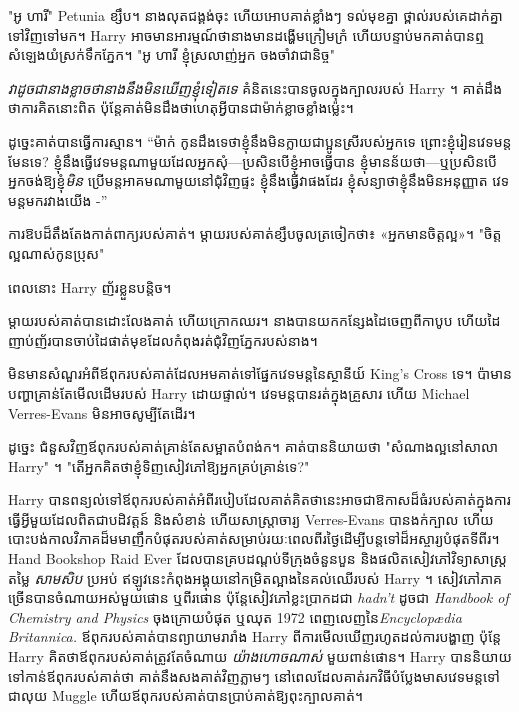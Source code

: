 "អូ ហារី" Petunia ខ្សឹប។ នាងលុតជង្គង់ចុះ ហើយអោបគាត់ខ្លាំងៗ ទល់មុខគ្នា ថ្ពាល់របស់គេដាក់គ្នាទៅវិញទៅមក។ Harry អាច​មាន​អារម្មណ៍​ថា​នាង​មាន​ដង្ហើម​ក្រៀមក្រំ ហើយ​បន្ទាប់​មក​គាត់​បាន​ឮ​សំឡេង​យំ​ស្រក់​ទឹក​ភ្នែក។ "អូ ហារី ខ្ញុំស្រលាញ់អ្នក ចងចាំវាជានិច្ច"

\emph{វាដូចជានាងខ្លាចថានាងនឹងមិនឃើញខ្ញុំទៀតទេ} គំនិតនេះបានចូលក្នុងក្បាលរបស់ Harry ។ គាត់​ដឹង​ថា​ការ​គិត​នោះ​ពិត ប៉ុន្តែ​គាត់​មិន​ដឹង​ថា​ហេតុ​អ្វី​បាន​ជា​ម៉ាក់​ខ្លាច​ខ្លាំង​ម្ល៉េះ។

ដូច្នេះគាត់បានធ្វើការស្មាន។ “ម៉ាក់ កូនដឹងទេថាខ្ញុំនឹងមិនក្លាយជាប្អូនស្រីរបស់អ្នកទេ ព្រោះខ្ញុំរៀនវេទមន្តមែនទេ? ខ្ញុំនឹងធ្វើវេទមន្តណាមួយដែលអ្នកសុំ—ប្រសិនបើខ្ញុំអាចធ្វើបាន ខ្ញុំមានន័យថា—ឬប្រសិនបើអ្នកចង់ឱ្យខ្ញុំ\emph{មិន} ប្រើមន្តអាគមណាមួយនៅជុំវិញផ្ទះ ខ្ញុំនឹងធ្វើវាផងដែរ ខ្ញុំសន្យាថាខ្ញុំនឹងមិនអនុញ្ញាត វេទមន្តមករវាងយើង -”

ការ​ឱប​ដ៏​តឹង​តែង​កាត់​ពាក្យ​របស់​គាត់។ ម្ដាយ​របស់​គាត់​ខ្សឹប​ចូល​ត្រចៀក​ថា៖ «អ្នក​មាន​ចិត្ត​ល្អ»។ "ចិត្តល្អណាស់កូនប្រុស"

ពេលនោះ Harry ញ័រខ្លួនបន្តិច។

ម្តាយ​របស់​គាត់​បាន​ដោះ​លែង​គាត់ ហើយ​ក្រោក​ឈរ។ នាងបានយកកន្សែងដៃចេញពីកាបូប ហើយដៃញាប់ញ័របានចាប់ដៃផាត់មុខដែលកំពុងរត់ជុំវិញភ្នែករបស់នាង។

មិនមានសំណួរអំពីឪពុករបស់គាត់ដែលអមគាត់ទៅផ្នែកវេទមន្តនៃស្ថានីយ៍ King's Cross ទេ។ ប៉ាមានបញ្ហាគ្រាន់តែមើលដើមរបស់ Harry ដោយផ្ទាល់។ វេទមន្តបានរត់ក្នុងគ្រួសារ ហើយ Michael Verres-Evans មិនអាចសូម្បីតែដើរ។

ដូច្នេះ ជំនួស​វិញ​ឪពុក​របស់​គាត់​គ្រាន់​តែ​សម្អាត​បំពង់ក។ គាត់បាននិយាយថា "សំណាងល្អនៅសាលា Harry" ។ "តើអ្នកគិតថាខ្ញុំទិញសៀវភៅឱ្យអ្នកគ្រប់គ្រាន់ទេ?"

Harry បានពន្យល់ទៅឪពុករបស់គាត់អំពីរបៀបដែលគាត់គិតថានេះអាចជាឱកាសដ៏ធំរបស់គាត់ក្នុងការធ្វើអ្វីមួយដែលពិតជាបដិវត្តន៍ និងសំខាន់ ហើយសាស្រ្តាចារ្យ Verres-Evans បានងក់ក្បាល ហើយបោះបង់កាលវិភាគដ៏មមាញឹកបំផុតរបស់គាត់សម្រាប់រយៈពេលពីរថ្ងៃដើម្បីបន្តទៅដ៏អស្ចារ្យបំផុតទីពីរ។ Hand Bookshop Raid Ever ដែលបានគ្របដណ្តប់ទីក្រុងចំនួនបួន និងផលិតសៀវភៅវិទ្យាសាស្ត្រតម្លៃ \emph{សាមសិប} ប្រអប់ ឥឡូវនេះកំពុងអង្គុយនៅកម្រិតល្អាងនៃគល់ឈើរបស់ Harry ។ សៀវភៅភាគច្រើនបានចំណាយអស់មួយផោន ឬពីរផោន ប៉ុន្តែសៀវភៅខ្លះប្រាកដជា \emph{hadn't} ដូចជា \emph{Handbook of Chemistry and Physics} ចុងក្រោយបំផុត ឬឈុត 1972 ពេញលេញនៃ\emph {Encyclopædia Britannica.} ឪពុករបស់គាត់បានព្យាយាមរារាំង Harry ពីការមើលឃើញរហូតដល់ការបង្ហាញ ប៉ុន្តែ Harry គិតថាឪពុករបស់គាត់ត្រូវតែចំណាយ \emph{យ៉ាងហោចណាស់} មួយពាន់ផោន។ Harry បាននិយាយទៅកាន់ឪពុករបស់គាត់ថា គាត់នឹងសងគាត់វិញភ្លាមៗ នៅពេលដែលគាត់រកវិធីបំប្លែងមាសវេទមន្តទៅជាលុយ Muggle ហើយឪពុករបស់គាត់បានប្រាប់គាត់ឱ្យពុះក្បាលគាត់។

